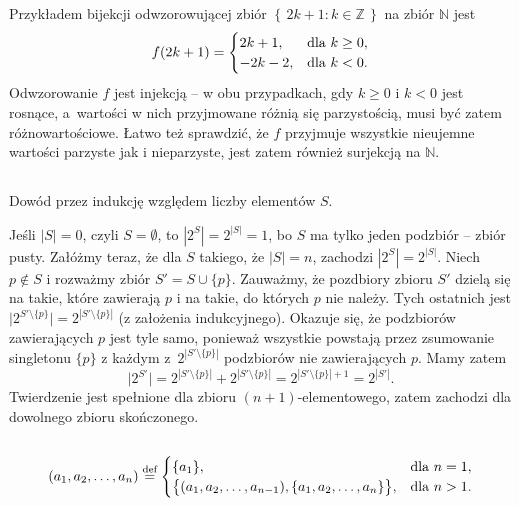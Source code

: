 \subsection{} %
Przykładem bijekcji odwzorowującej zbiór $\left\{\,2k+1:k\in\mathbb{Z}\,\right\}$ na zbiór $\mathbb{N}$ jest
\[
	f(2k+1) =
	\begin{cases}
		2k+1, & \hbox{dla }k\ge0, \\
		-2k-2, & \hbox{dla }k<0.
	\end{cases}
\]
Odwzorowanie $f$ jest injekcją -- w obu przypadkach, gdy $k\ge0$ i $k<0$ jest rosnące, a~wartości w nich przyjmowane różnią się parzystością, musi być zatem różnowartościowe. Łatwo też sprawdzić, że $f$ przyjmuje wszystkie nieujemne wartości parzyste jak i nieparzyste, jest zatem również surjekcją na $\mathbb{N}$.

\subsection{} %
Dowód przez indukcję względem liczby elementów $S$.

Jeśli $|S|=0$, czyli $S=\emptyset$, to $|2^S|=2^{|S|}=1$, bo $S$ ma tylko jeden podzbiór -- zbiór pusty. Załóżmy teraz, że dla $S$ takiego, że $|S|=n$, zachodzi $|2^S|=2^{|S|}$. Niech $p\not\in S$ i rozważmy zbiór $S'=S\cup\{p\}$. Zauważmy, że pozdbiory zbioru $S'$ dzielą się na takie, które zawierają $p$ i na takie, do których $p$ nie należy. Tych ostatnich jest $\bigl|2^{S'\setminus\{p\}}\bigr|=2^{\left|S'\setminus\{p\}\right|}$ (z założenia indukcyjnego). Okazuje się, że podzbiorów zawierających $p$ jest tyle samo, ponieważ wszystkie powstają przez zsumowanie singletonu $\{p\}$ z każdym z~$2^{\left|S'\setminus\{p\}\right|}$ podzbiorów nie zawierających $p$. Mamy zatem
\[
	\bigl|2^{S'}\bigr|=2^{\left|S'\setminus\{p\}\right|}+2^{\left|S'\setminus\{p\}\right|} = 2^{\left|S'\setminus\{p\}\right|+1} = 2^{|S'|}.
\]
Twierdzenie jest spełnione dla zbioru $(n+1)$-elementowego, zatem zachodzi dla dowolnego zbioru skończonego.

\subsection{} %
\[
	(a_1,a_2,\dots,a_n)\stackrel{\hbox{\scriptsize def}}{=}
	\begin{cases}
		\{a_1\}, & \hbox{dla }n=1, \\
		\bigl\{(a_1,a_2,\dots,a_{n-1}),\{a_1,a_2,\dots,a_n\}\bigr\}, & \hbox{dla }n>1.
	\end{cases}
\]

